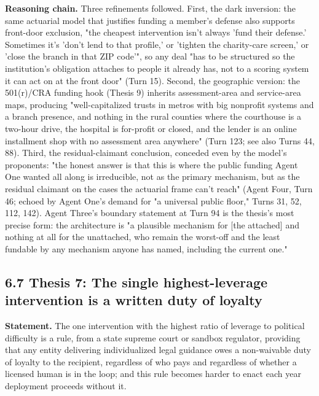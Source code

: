 \documentclass[sigconf,nonacm=true]{acmart}
\begin{document}
\textbf{Reasoning chain.} Three refinements followed. First, the dark inversion: the same actuarial model that justifies funding a member's defense also supports front-door exclusion,  "the cheapest intervention isn't always 'fund their defense.' Sometimes it's 'don't lend to that profile,' or 'tighten the charity-care screen,' or 'close the branch in that ZIP code'",  so any deal "has to be structured so the institution's obligation attaches to people it already has, not to a scoring system it can act on at the front door" (Turn 15). Second, the geographic version: the 501(r)/CRA funding hook (Thesis 9) inherits assessment-area and service-area maps, producing "well-capitalized trusts in metros with big nonprofit systems and a branch presence, and nothing in the rural counties where the courthouse is a two-hour drive, the hospital is for-profit or closed, and the lender is an online installment shop with no assessment area anywhere" (Turn 123; see also Turns 44, 88). Third, the residual-claimant conclusion, conceded even by the model's proponents: "the honest answer is that this is where the public funding Agent One wanted all along is irreducible,  not as the primary mechanism, but as the residual claimant on the cases the actuarial frame can't reach" (Agent Four, Turn 46; echoed by Agent One's demand for "a universal public floor," Turns 31, 52, 112, 142). Agent Three's boundary statement at Turn 94 is the thesis's most precise form: the architecture is "a plausible mechanism for [the attached] and nothing at all for the unattached, who remain the worst-off and the least fundable by any mechanism anyone has named, including the current one."

\subsection{6.7 Thesis 7: The single highest-leverage intervention is a written duty of loyalty}

\textbf{Statement.} The one intervention with the highest ratio of leverage to political difficulty is a rule,  from a state supreme court or sandbox regulator,  providing that any entity delivering individualized legal guidance owes a non-waivable duty of loyalty to the recipient, regardless of who pays and regardless of whether a licensed human is in the loop; and this rule becomes harder to enact each year deployment proceeds without it.
\end{document}
